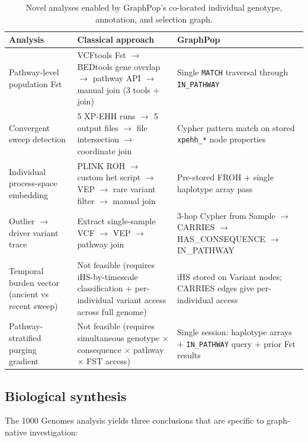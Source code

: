 \begin{table}[h]
\centering
\small
\caption{Novel analyses enabled by GraphPop's co-located individual genotype, annotation, and selection graph.}
\label{tab:novel}
\begin{tabular}{p{4.2cm} p{4.8cm} p{4.8cm}}
\toprule
\textbf{Analysis} & \textbf{Classical approach} & \textbf{GraphPop} \\
\midrule
Pathway-level population Fst & VCFtools Fst $\to$ BEDtools gene overlap $\to$ pathway API $\to$ manual join (3 tools + join) & Single \texttt{MATCH} traversal through \texttt{IN\_PATHWAY} \\
\addlinespace
Convergent sweep detection & 5 XP-EHH runs $\to$ 5 output files $\to$ file intersection $\to$ coordinate join & Cypher pattern match on stored \texttt{xpehh\_*} node properties \\
\addlinespace
Individual process-space embedding & PLINK ROH $\to$ custom het script $\to$ VEP $\to$ rare variant filter $\to$ manual join & Pre-stored FROH + single haplotype array pass \\
\addlinespace
Outlier $\to$ driver variant trace & Extract single-sample VCF $\to$ VEP $\to$ pathway join & 3-hop Cypher from Sample $\to$ CARRIES $\to$ HAS\_CONSEQUENCE $\to$ IN\_PATHWAY \\
\addlinespace
Temporal burden vector (ancient vs recent sweep) & Not feasible (requires iHS-by-timescale classification + per-individual variant access across full genome) & iHS stored on Variant nodes; CARRIES edges give per-individual access \\
\addlinespace
Pathway-stratified purging gradient & Not feasible (requires simultaneous genotype $\times$ consequence $\times$ pathway $\times$ FST access) & Single session: haplotype arrays $+$ \texttt{IN\_PATHWAY} query $+$ prior Fst results \\
\bottomrule
\end{tabular}
\end{table}

\subsection*{Biological synthesis}

The 1000 Genomes analysis yields three conclusions that are specific to graph-native investigation:

